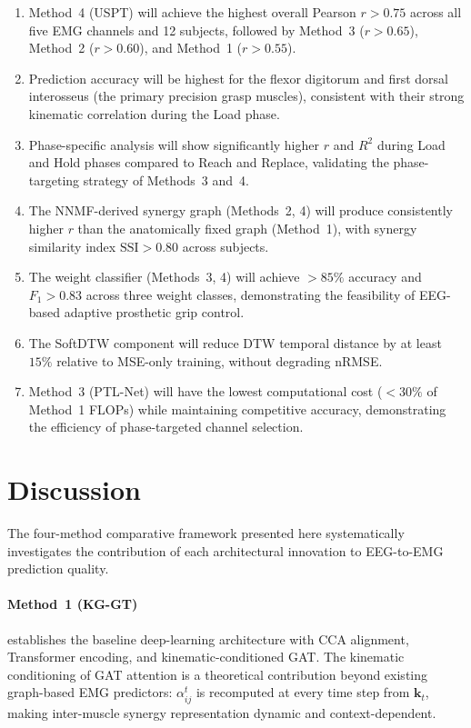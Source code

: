 \documentclass[12pt, a4paper]{article}
\begin{document}
	\begin{enumerate}[label=\textbf{H\arabic*.}, leftmargin=*, itemsep=4pt]
		\item Method~4 (USPT) will achieve the highest overall Pearson $r > 0.75$
		across all five EMG channels and 12 subjects, followed by Method~3
		($r > 0.65$), Method~2 ($r > 0.60$), and Method~1 ($r > 0.55$).
		\item Prediction accuracy will be highest for the flexor digitorum and
		first dorsal interosseus (the primary precision grasp muscles),
		consistent with their strong kinematic correlation during the Load phase.
		\item Phase-specific analysis will show significantly higher $r$ and $R^2$
		during Load and Hold phases compared to Reach and Replace, validating
		the phase-targeting strategy of Methods~3 and~4.
		\item The NNMF-derived synergy graph (Methods~2, 4) will produce
		consistently higher $r$ than the anatomically fixed graph (Method~1),
		with synergy similarity index $\mathrm{SSI} > 0.80$ across subjects.
		\item The weight classifier (Methods~3, 4) will achieve $> 85\%$
		accuracy and $F_1 > 0.83$ across three weight classes, demonstrating
		the feasibility of EEG-based adaptive prosthetic grip control.
		\item The SoftDTW component will reduce DTW temporal distance by at least
		$15\%$ relative to MSE-only training, without degrading nRMSE.
		\item Method~3 (PTL-Net) will have the lowest computational cost
		($< 30\%$ of Method~1 FLOPs) while maintaining competitive accuracy,
		demonstrating the efficiency of phase-targeted channel selection.
	\end{enumerate}
	
	\section{Discussion}
	
	The four-method comparative framework presented here systematically
	investigates the contribution of each architectural innovation to
	EEG-to-EMG prediction quality.
	
	\paragraph{Method~1 (KG-GT)} establishes the baseline deep-learning
	architecture with CCA alignment, Transformer encoding, and
	kinematic-conditioned GAT. The kinematic conditioning of GAT attention
	is a theoretical contribution beyond existing graph-based EMG predictors:
	$\alpha_{ij}^t$ is recomputed at every time step from $\bm{k}_t$, making
	inter-muscle synergy representation dynamic and context-dependent.
	
\end{document}
